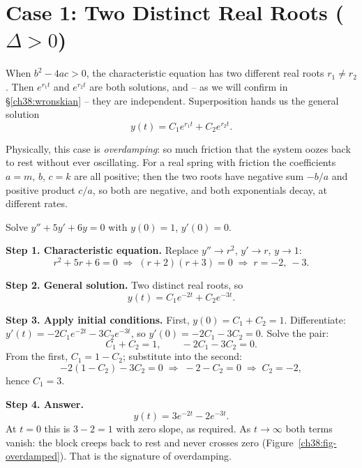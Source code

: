 \section{Case 1: Two Distinct Real Roots \texorpdfstring{($\Delta > 0$)}{(Delta > 0)}}
\label{ch38:real-roots}

When $b^2 - 4ac > 0$, the characteristic equation has two different real roots
$r_1 \neq r_2$. Then $e^{r_1 t}$ and $e^{r_2 t}$ are both solutions, and -- as we
will confirm in \S\ref{ch38:wronskian} -- they are independent. Superposition
hands us the general solution
\begin{equation}
  y(t) = C_1 e^{r_1 t} + C_2 e^{r_2 t}.
  \label{ch38:real-general}
\end{equation}

Physically, this case is \emph{overdamping}: so much friction that the system
oozes back to rest without ever oscillating. For a real spring with friction
the coefficients $a = m$, $b$, $c = k$ are all positive; then the two roots have
negative sum $-b/a$ and positive product $c/a$, so both are negative, and both
exponentials decay, at different rates.

\begin{example}
\label{ch38:ex-real}
Solve $y'' + 5y' + 6y = 0$ with $y(0) = 1$, $y'(0) = 0$.

\textbf{Step 1. Characteristic equation.} Replace $y'' \to r^2$, $y' \to r$,
$y \to 1$:
\[
  r^2 + 5r + 6 = 0 \;\Longrightarrow\; (r+2)(r+3) = 0
  \;\Longrightarrow\; r = -2,\ -3.
\]

\textbf{Step 2. General solution.} Two distinct real roots, so
\[
  y(t) = C_1 e^{-2t} + C_2 e^{-3t}.
\]

\textbf{Step 3. Apply initial conditions.} First, $y(0) = C_1 + C_2 = 1$.
Differentiate: $y'(t) = -2 C_1 e^{-2t} - 3 C_2 e^{-3t}$, so $y'(0) = -2C_1 - 3C_2
= 0$. Solve the pair:
\[
  C_1 + C_2 = 1, \qquad -2C_1 - 3C_2 = 0.
\]
From the first, $C_1 = 1 - C_2$; substitute into the second:
\[
  -2(1-C_2) - 3C_2 = 0
  \;\Longrightarrow\; -2 - C_2 = 0
  \;\Longrightarrow\; C_2 = -2,
\]
hence $C_1 = 3$.

\textbf{Step 4. Answer.}
\[
  y(t) = 3 e^{-2t} - 2 e^{-3t}.
\]
At $t=0$ this is $3 - 2 = 1$ with zero slope, as required. As $t \to \infty$ both
terms vanish: the block creeps back to rest and never crosses zero
(Figure~\ref{ch38:fig-overdamped}). That is the
signature of overdamping.
\end{example}

